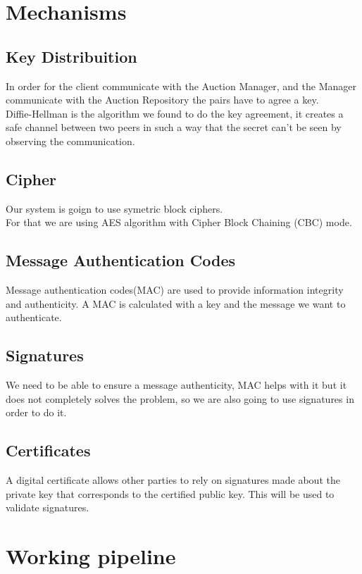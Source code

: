 \documentclass[pdftex,12pt,a4paper]{report}
\begin{document}
\newpage
\section{Mechanisms}
\vskip 1cm
\subsection{Key Distribuition}
In order for the client communicate with the Auction Manager, and the Manager communicate with the Auction Repository the pairs have to agree a key.\\

Diffie-Hellman is the algorithm we found to do the key agreement, it creates a safe channel between two peers in such a way that the secret can't be seen by observing the communication.

\vskip 1.5cm
\subsection{Cipher}
Our system is goign to use symetric block ciphers.\\

For that we are using AES algorithm with Cipher Block Chaining (CBC) mode.

\vskip 1.5cm
\subsection{Message Authentication Codes}
Message authentication codes(MAC) are used to provide information integrity and authenticity. A MAC is calculated with a key and the message we want to authenticate.

\vskip 1.5cm
\subsection{Signatures}
We need to be able to ensure a message authenticity, MAC helps with it but it does not completely solves the problem, so we are also going to use signatures in order to do it.

\vskip 1.5cm
\subsection{Certificates}
A digital certificate allows other parties to rely on signatures made about the private key that corresponds to the certified public key. This will be used to validate signatures.

\vskip 3cm
\section{Working pipeline}
\end{document}

